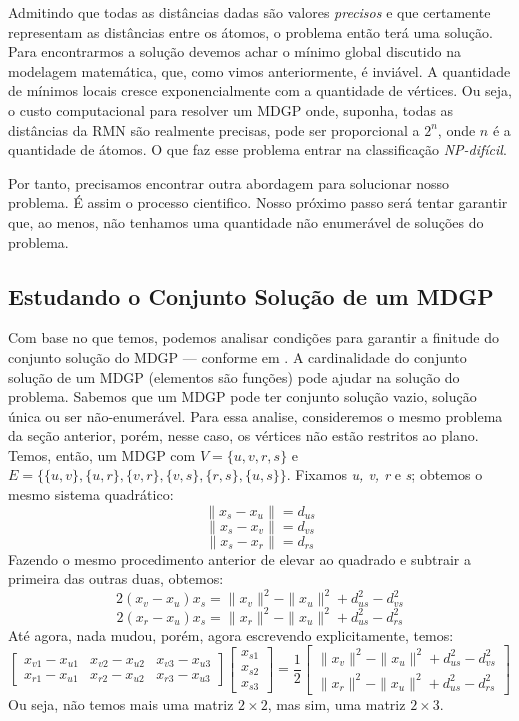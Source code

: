 \documentclass[a4paper,12pt]{article}
\begin{document}
	Admitindo que todas as distâncias dadas são valores \textit{precisos} e que certamente representam as distâncias entre os átomos, o problema então terá uma solução. Para encontrarmos a solução devemos achar o mínimo global discutido na modelagem matemática, que, como vimos anteriormente, é inviável. A quantidade de mínimos locais cresce exponencialmente com a quantidade de vértices. Ou seja, o custo computacional para resolver um MDGP onde, suponha, todas as distâncias da RMN são realmente precisas, pode ser proporcional a $2^n$, onde $n$ é a quantidade de átomos. O que faz esse problema entrar na classificação \textit{NP-difícil}. \cite{ComplexidadeComp}
	
	Por tanto, precisamos encontrar outra abordagem para solucionar nosso problema. É assim o processo cientifico. Nosso próximo passo será tentar garantir que, ao menos, não tenhamos uma quantidade não enumerável de soluções do problema.
	
	\subsection{Estudando o Conjunto Solução de um MDGP}
	Com base no que temos, podemos analisar condições para garantir a finitude do conjunto solução do MDGP --- conforme em \cite{carlileBook31Coloquio}. A cardinalidade do conjunto solução de um MDGP (elementos são funções) pode ajudar na solução do problema. Sabemos que um MDGP pode ter conjunto solução vazio, solução única ou ser não-enumerável. Para essa analise, consideremos o mesmo problema da seção anterior, porém, nesse caso, os vértices não estão restritos ao plano. Temos, então, um MDGP com $V=\{u, v, r, s\}$ e $E=\{\{u,v\}, \{u, r\}, \{v, r\}, \{v, s\}, \{r, s\}, \{u, s\}\}$. Fixamos \textit{u, v, r} e \textit{s}; obtemos o mesmo sistema quadrático:
	$$
	\|x_{s} - x_{u}\|= d_{us}
	$$
	$$
	\|x_{s} - x_{v}\|= d_{vs}
	$$
	$$
	\|x_{s} - x_{r}\|= d_{rs}
	$$
	Fazendo o mesmo procedimento anterior de elevar ao quadrado e subtrair a primeira das outras duas, obtemos:
	$$
	2(x_{v} - x_{u})x_{s} = \|x_{v}\|^{2} - \|x_{u}\|^{2} + d_{us}^{2} - d_{vs}^{2}
	$$
	$$
	2(x_{r} - x_{u})x_{s} = \|x_{r}\|^{2} - \|x_{u}\|^{2} + d_{us}^{2} - d_{rs}^{2}
	$$
	Até agora, nada mudou, porém, agora escrevendo explicitamente, temos:
	$$
	\begin{bmatrix}
	x_{v1} - x_{u1} & x_{v2} - x_{u2} & x_{v3} - x_{u3}\\
	x_{r1} - x_{u1} & x_{r2} - x_{u2} & x_{r3} - x_{u3}
	\end{bmatrix}
	\begin{bmatrix}
	x_{s1}\\
	x_{s2}\\
	x_{s3}
	\end{bmatrix} =
	\frac{1}{2}\begin{bmatrix}
	\|x_{v}\|^{2} - \|x_{u}\|^{2} + d_{us}^{2} - d_{vs}^{2}\\
	\|x_{r}\|^{2} - \|x_{u}\|^{2} + d_{us}^{2} - d_{rs}^{2}
	\end{bmatrix}
	$$
	Ou seja, não temos mais uma matriz $2 \times 2$, mas  sim, uma matriz $2 \times 3$.
	
\end{document}
